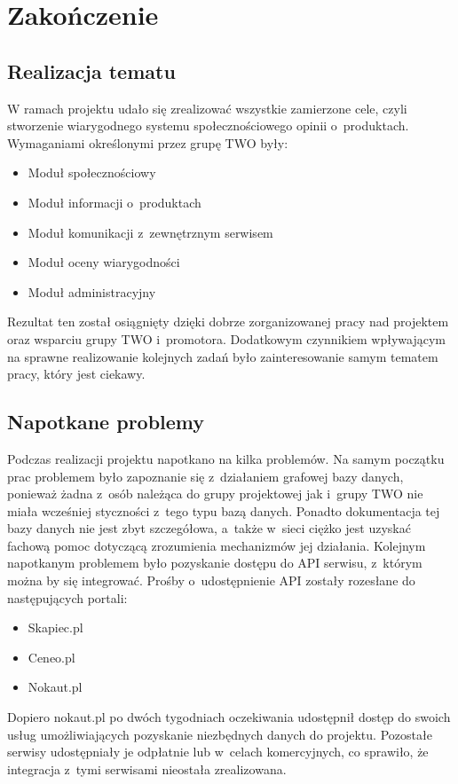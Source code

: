 \chapter{Zakończenie}

\section{Realizacja tematu}

W ramach projektu udało się zrealizować wszystkie zamierzone cele, czyli stworzenie wiarygodnego systemu społecznościowego opinii o~produktach. Wymaganiami określonymi przez grupę TWO były:
\begin{itemize}
\item Moduł społecznościowy
\item Moduł informacji o~produktach
\item Moduł komunikacji z~zewnętrznym serwisem
\item Moduł oceny wiarygodności
\item Moduł administracyjny
\end{itemize}
Rezultat ten został osiągnięty dzięki dobrze zorganizowanej pracy nad projektem oraz wsparciu grupy TWO i~promotora. Dodatkowym czynnikiem wpływającym na sprawne realizowanie kolejnych zadań było zainteresowanie samym tematem pracy, który jest ciekawy.

\section{Napotkane problemy}

Podczas realizacji projektu napotkano na kilka problemów. Na samym początku prac problemem było zapoznanie się z~działaniem grafowej bazy danych, ponieważ żadna z~osób należąca do grupy projektowej jak i~grupy TWO nie miała wcześniej styczności z~tego typu bazą danych. Ponadto dokumentacja tej bazy danych nie jest zbyt szczegółowa, a~także w~sieci ciężko jest uzyskać fachową pomoc dotyczącą zrozumienia mechanizmów jej działania.
Kolejnym napotkanym problemem było pozyskanie dostępu do API serwisu, z~którym można by się integrować. Prośby o~udostępnienie API zostały rozesłane do następujących portali:
\begin{itemize}
\item Skapiec.pl
\item Ceneo.pl
\item Nokaut.pl
\end{itemize}
Dopiero nokaut.pl po dwóch tygodniach oczekiwania udostępnił dostęp do swoich usług umożliwiających pozyskanie niezbędnych danych do projektu. Pozostałe serwisy udostępniały je odpłatnie lub w~celach komercyjnych, co sprawiło, że integracja z~tymi serwisami nieostała zrealizowana.

